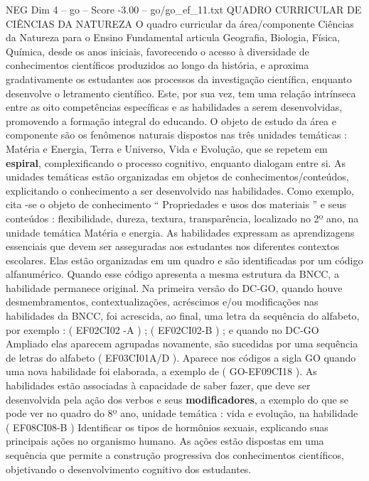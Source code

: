 \begin{textsample}{NEG Dim 4 – go – Score -3.00 – go/go\_ef\_11.txt}  \label{ex:f4_neg_222}
QUADRO CURRICULAR DE CIÊNCIAS DA NATUREZA O quadro curricular da área/componente Ciências da Natureza para o Ensino Fundamental articula Geografia, Biologia, Física, Química, desde os anos iniciais, favorecendo o acesso à diversidade de conhecimentos científicos produzidos ao longo da história, e aproxima gradativamente os estudantes aos processos da investigação científica, enquanto desenvolve o letramento científico.
Este, por sua vez, tem uma relação intrínseca entre as oito competências específicas e as habilidades a serem desenvolvidas, promovendo a formação integral do educando.
O objeto de estudo da área e componente são os fenômenos naturais dispostos nas três unidades temáticas : Matéria e Energia, Terra e Universo, Vida e Evolução, que se repetem em \textbf{espiral}, complexificando o processo cognitivo, enquanto dialogam entre si.
As unidades temáticas estão organizadas em objetos de conhecimentos/conteúdos, explicitando o conhecimento a ser desenvolvido nas habilidades.
Como exemplo, cita -se o objeto de conhecimento “ Propriedades e usos dos materiais ” e seus conteúdos : flexibilidade, dureza, textura, transparência, localizado no 2º ano, na unidade temática Matéria e energia.
As habilidades expressam as aprendizagens essenciais que devem ser asseguradas aos estudantes nos diferentes contextos escolares.
Elas estão organizadas em um quadro e são identificadas por um código alfanumérico.
Quando esse código apresenta a mesma estrutura da BNCC, a habilidade permanece original.
Na primeira versão do DC-GO, quando houve desmembramentos, contextualizações, acréscimos e/ou modificações nas habilidades da BNCC, foi acrescida, ao final, uma letra da sequência do alfabeto, por exemplo : ( EF02CI02 -A ) ; ( EF02CI02-B ) ; e quando no DC-GO Ampliado elas aparecem agrupadas novamente, são sucedidas por uma sequência de letras do alfabeto ( EF03CI01A/D ).
Aparece nos códigos a sigla GO quando uma nova habilidade foi elaborada, a exemplo de ( GO-EF09CI18 ).
As habilidades estão associadas à capacidade de saber fazer, que deve ser desenvolvida pela ação dos verbos e seus \textbf{modificadores}, a exemplo do que se pode ver no quadro do 8º ano, unidade temática : vida e evolução, na habilidade ( EF08CI08-B ) Identificar os tipos de hormônios sexuais, explicando suas principais ações no organismo humano.
As ações estão dispostas em uma sequência que permite a construção progressiva dos conhecimentos científicos, objetivando o desenvolvimento cognitivo dos estudantes.

\end{textsample}
